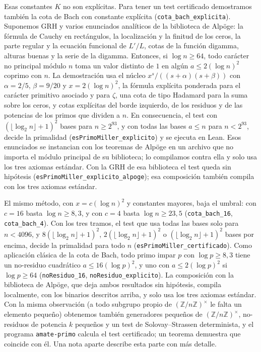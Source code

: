 \documentclass[11pt,a4paper]{amsart}
\theoremstyle{definition}
\theoremstyle{remark}
\begin{document}
Esas constantes $K$ no son expl\'icitas. Para tener un test certificado demostramos tambi\'en la cota de Bach con constante expl\'icita (\texttt{cota\_bach\_explicita}). Suponemos GRH y varios enunciados anal\'iticos de la biblioteca de Alp\"oge: la f\'ormula de Cauchy en rect\'angulos, la localizaci\'on y la finitud de los ceros, la parte regular y la ecuaci\'on funcional de $L'/L$, cotas de la funci\'on digamma, alturas buenas y la serie de la digamma. Entonces, si $\log n\ge 64$, todo car\'acter no principal m\'odulo $n$ toma un valor distinto de $1$ en alg\'un $a\le 2(\log n)^2$ coprimo con $n$. La demostraci\'on usa el n\'ucleo $x^s/((s+\alpha)(s+\beta))$ con $\alpha=2/5$, $\beta=9/20$ y $x=2(\log n)^2$, la f\'ormula expl\'icita ponderada para el car\'acter primitivo asociado y para $\zeta$, una cota de tipo Hadamard para la suma sobre los ceros, y cotas expl\'icitas del borde izquierdo, de los residuos y de las potencias de los primos que dividen a $n$. En consecuencia, el test con $(\lfloor\log_2 n\rfloor+1)^2$ bases para $n\ge 2^{93}$, y con todas las bases $a\le n$ para $n<2^{93}$, decide la primalidad (\texttt{esPrimoMiller\_explicito}) y se ejecuta en Lean. Esos enunciados se instancian con los teoremas de Alp\"oge en un archivo que no importa el m\'odulo principal de su biblioteca; lo compilamos contra ella y solo usa los tres axiomas est\'andar. Con la GRH de esa biblioteca el test queda sin hip\'otesis (\texttt{esPrimoMiller\_explicito\_alpoge}); esa composici\'on tambi\'en compila con los tres axiomas est\'andar.

El mismo m\'etodo, con $x=c(\log n)^2$ y constantes mayores, baja el umbral: con $c=16$ basta $\log n\ge 8{,}3$, y con $c=4$ basta $\log n\ge 23{,}5$ (\texttt{cota\_bach\_16}, \texttt{cota\_bach\_4}). Con los tres tramos, el test que usa todas las bases solo para $n<4096$, y $8(\lfloor\log_2 n\rfloor+1)^2$, $2(\lfloor\log_2 n\rfloor+1)^2$ o $(\lfloor\log_2 n\rfloor+1)^2$ bases por encima, decide la primalidad para todo $n$ (\texttt{esPrimoMiller\_certificado}). Como aplicaci\'on cl\'asica de la cota de Bach, todo primo impar $p$ con $\log p\ge 8{,}3$ tiene un no-residuo cuadr\'atico $a\le 16(\log p)^2$, y uno con $a\le 2(\log p)^2$ si $\log p\ge 64$ (\texttt{noResiduo\_16}, \texttt{noResiduo\_explicito}). La composici\'on con la biblioteca de Alp\"oge, que deja ambos resultados sin hip\'otesis, compila localmente, con los binarios descritos arriba, y solo usa los tres axiomas est\'andar. Con la misma observaci\'on (a todo subgrupo propio de $(\mathbb Z/n\mathbb Z)^\times$ le falta un elemento peque\~no) obtenemos tambi\'en generadores peque\~nos de $(\mathbb Z/n\mathbb Z)^\times$, no-residuos de potencia $k$ peque\~nos y un test de Solovay--Strassen determinista, y el programa \texttt{amate-primo} calcula el test certificado; un teorema demuestra que coincide con \'el. Una nota aparte describe esta parte con m\'as detalle.
\end{document}
